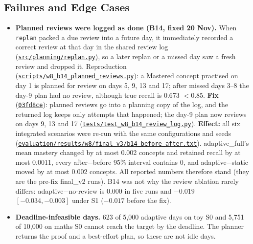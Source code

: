 \documentclass[english]{sintr}
\newcommand{\repourl}{https://github.com/Bhuvan-56/adaptive-learning-path-planner-DAT}
\newcommand{\sha}{cs5903-final-2026}
\DeclareRobustCommand{\rf}[1]{\href{\repourl/blob/\sha/#1}{\nolinkurl{#1}}}
\DeclareRobustCommand{\cm}[1]{\href{\repourl/commit/#1}{\texttt{#1}}}
\newcommand{\shax}{cs5903-final-2026}
\DeclareRobustCommand{\rfx}[1]{\href{\repourl/blob/\shax/#1}{\nolinkurl{#1}}}
\DeclareRobustCommand{\rfm}[1]{\href{\repourl/blob/\sha/#1}{\nolinkurl{#1}}}
\begin{document}
\subsection{Failures and Edge Cases}
\label{sec:failures}
\begin{itemize}
    \item \textbf{Planned reviews were logged as done (B14, fixed 20 Nov).} When \texttt{replan} packed a due review into a future day, it immediately recorded a correct review at that day in the shared review log (\rf{src/planning/replan.py}), so a later replan or a missed day saw a fresh review and dropped it. Reproduction (\rfx{scripts/w8_b14_planned_reviews.py}): a Mastered concept practised on day 1 is planned for review on days 5, 9, 13 and 17; after missed days 3--8 the day-9 plan had no review, although true recall is 0.673 $<0.85$. \textbf{Fix} (\cm{03fd8ce}): planned reviews go into a planning copy of the log, and the returned log keeps only attempts that happened; the day-9 plan now reviews on days 9, 13 and 17 (\rfm{tests/test_w8_b14_review_log.py}). \textbf{Effect:} all six integrated scenarios were re-run with the same configurations and seeds (\rfm{evaluation/results/w8/final_v3/b14_before_after.txt}). adaptive\_full's mean mastery changed by at most 0.002 concepts and retained recall by at most 0.0011, every after$-$before 95\% interval contains 0, and adaptive$-$static moved by at most 0.002 concepts. All reported numbers therefore stand (they are the pre-fix final\_v2 runs). B14 was not why the review ablation rarely differs: adaptive$-$no-review is 0.000 in five runs and $-0.019$ $[-0.034, -0.003]$ under S1 ($-0.017$ before the fix).
    \item \textbf{Deadline-infeasible days.} 623 of 5,000 adaptive days on toy S0 and 5,751 of 10,000 on maths S0 cannot reach the target by the deadline. The planner returns the proof and a best-effort plan, so these are not idle days.

\end{itemize}
\end{document}
